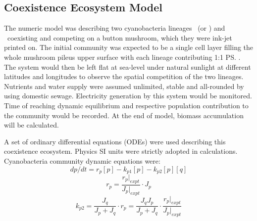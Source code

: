 \documentclass[../thesis.tex]{subfiles} %
\begin{document}
\subsection{Coexistence Ecosystem Model}

The numeric model was describing two cyanobacteria lineages \As\ (or \Ss) and \Cs\ coexisting and competing on a button mushroom,\autocite{joshi2018bacterial} which they were ink-jet printed on.  The initial community was expected to be a single cell layer filling the whole mushroom pileus upper surface with each lineage contributing 1:1 \ps.  The system would then be left flat at sea-level under natural sunlight at different latitudes and longitudes to observe the spatial competition of the two lineages.  Nutrients and water supply were assumed unlimited, stable and all-rounded by using domestic sewage.\autocite{markou2014microalgal}  Electricity generation by this system would be monitored.  Time of reaching dynamic equilibrium and respective population contribution to the community would be recorded.  At the end of model, biomass accumulation will be calculated.

A set of ordinary differential equations (ODEs) were used describing this coexistence ecosystem.  Physics SI units were strictly adopted in calculations.  Cyanobacteria community dynamic equations were:
\begin{equation}\label{eq:main}
    dp/dt = r_p [p] - k_{p1} [p] - k_{p2} [p][q]
\end{equation}
\begin{equation}\label{eq:growth}
    r_p = \dfrac{r_p|_{expt}}{J_p|_{expt}}\cdot J_p
\end{equation}
\begin{equation}\label{eq:compete}
    k_{p2} = \dfrac{J_q}{J_p + J_q}\cdot r_p = \dfrac{J_q J_p}{J_p + J_q}\cdot \dfrac{r_p|_{expt}}{J_p|_{expt}}
\end{equation}
\end{document}
